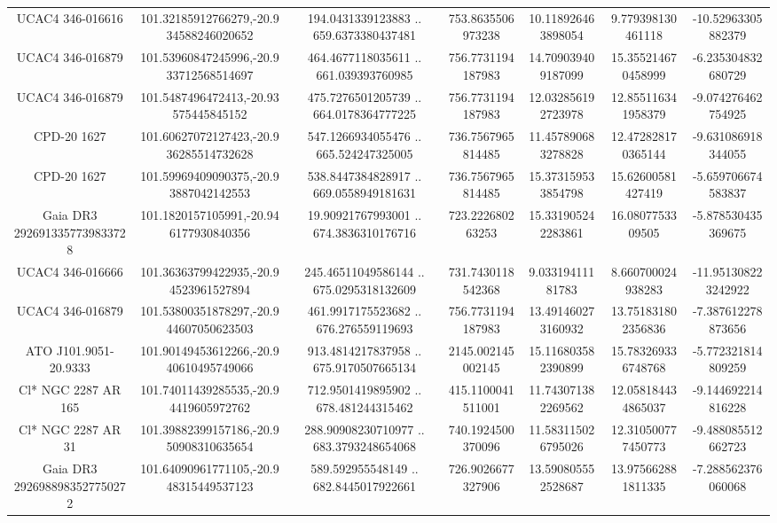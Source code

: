 \begin{table}
\begin{tabular}{ccccccc}
UCAC4 346-016616 & 101.32185912766279,-20.934588246020652 & 194.0431339123883 .. 659.6373380437481 & 753.8635506973238 & 10.118926463898054 & 9.779398130461118 & -10.52963305882379 \\
UCAC4 346-016879 & 101.53960847245996,-20.933712568514697 & 464.4677118035611 .. 661.039393760985 & 756.7731194187983 & 14.709039409187099 & 15.355214670458999 & -6.235304832680729 \\
UCAC4 346-016879 & 101.5487496472413,-20.93575445845152 & 475.7276501205739 .. 664.0178364777225 & 756.7731194187983 & 12.032856192723978 & 12.855116341958379 & -9.074276462754925 \\
CPD-20  1627 & 101.60627072127423,-20.936285514732628 & 547.1266934055476 .. 665.524247325005 & 736.7567965814485 & 11.457890683278828 & 12.472828170365144 & -9.631086918344055 \\
CPD-20  1627 & 101.59969409090375,-20.93887042142553 & 538.8447384828917 .. 669.0558949181631 & 736.7567965814485 & 15.373159533854798 & 15.62600581427419 & -5.659706674583837 \\
Gaia DR3 2926913357739833728 & 101.1820157105991,-20.946177930840356 & 19.90921767993001 .. 674.3836310176716 & 723.222680263253 & 15.331905242283861 & 16.0807753309505 & -5.878530435369675 \\
UCAC4 346-016666 & 101.36363799422935,-20.94523961527894 & 245.46511049586144 .. 675.0295318132609 & 731.7430118542368 & 9.03319411181783 & 8.660700024938283 & -11.951308223242922 \\
UCAC4 346-016879 & 101.53800351878297,-20.944607050623503 & 461.9917175523682 .. 676.276559119693 & 756.7731194187983 & 13.491460273160932 & 13.751831802356836 & -7.387612278873656 \\
ATO J101.9051-20.9333 & 101.90149453612266,-20.940610495749066 & 913.4814217837958 .. 675.9170507665134 & 2145.002145002145 & 15.116803582390899 & 15.783269336748768 & -5.772321814809259 \\
Cl* NGC 2287     AR     165 & 101.74011439285535,-20.94419605972762 & 712.9501419895902 .. 678.481244315462 & 415.1100041511001 & 11.743071382269562 & 12.058184434865037 & -9.144692214816228 \\
Cl* NGC 2287     AR      31 & 101.39882399157186,-20.950908310635654 & 288.90908230710977 .. 683.3793248654068 & 740.1924500370096 & 11.583115026795026 & 12.310500777450773 & -9.488085512662723 \\
Gaia DR3 2926988983527750272 & 101.64090961771105,-20.948315449537123 & 589.592955548149 .. 682.8445017922661 & 726.9026677327906 & 13.590805552528687 & 13.975662881811335 & -7.288562376060068 \\

\end{tabular}
\end{table}
